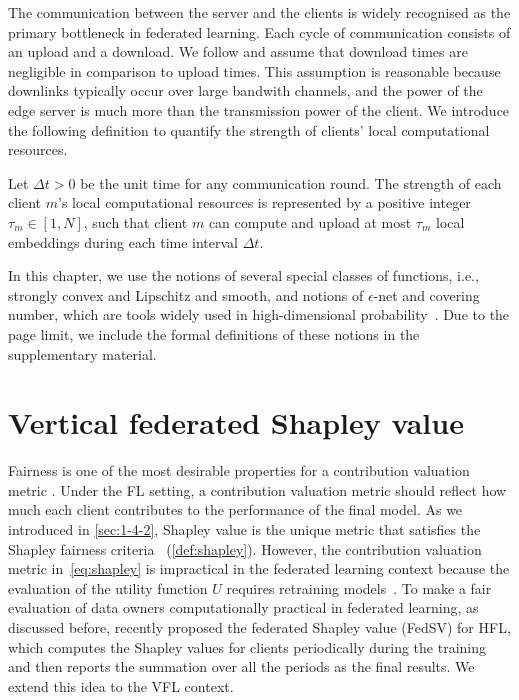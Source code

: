 The communication between the server and the clients is widely recognised as the primary bottleneck in federated learning. Each cycle of communication consists of an upload and a download. We follow \citet{dinh2020federated} and assume that  download times are negligible in comparison to upload times. This assumption is reasonable because downlinks typically occur over large bandwith channels, and the power of the edge server is much more than the transmission power of the client. We introduce the following definition to quantify the strength of clients' local computational resources.

\begin{definition} \label{def:communication}
    Let $\Delta t > 0$ be the unit time for any communication round. The strength of each client $m$'s local computational resources is represented by a positive integer $\tau_m \in [1, N]$, such that client $m$ can compute and upload at most $\tau_m$ local embeddings during each time interval $\Delta t$. 
\end{definition}

In this chapter, we use the notions of several special classes of functions, i.e., strongly convex and Lipschitz and smooth, and notions of $\epsilon$-net and covering number, which are tools widely used in high-dimensional probability~\citep{vershynin2018high}. Due to the page limit, we include the formal definitions of these notions in the supplementary material.

\section{Vertical federated Shapley value} \label{sec:8-4}
Fairness is one of the most desirable properties for a contribution valuation metric \citep{ghorbani2019data,pei2020survey}. Under the FL setting, a contribution valuation metric should reflect how much each client contributes to the performance of the final model. As we introduced in \autoref{sec:1-4-2}, Shapley value is the unique metric that satisfies the Shapley fairness criteria~\citep{shapley201617} (\autoref{def:shapley}). However, the contribution valuation metric in~\eqref{eq:shapley} is impractical in the federated learning context because the evaluation of the utility function $U$ requires retraining models~\citep{ghorbani2019data,wang2020principled}. To make a fair evaluation of data owners computationally practical in federated learning, as discussed before, \citet{wang2020principled} recently proposed the federated Shapley value (FedSV) for HFL, which computes the Shapley values for clients periodically during the training and then reports the summation over all the periods as the final results. We extend this idea to the VFL context. 

